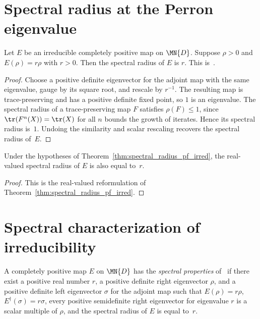 \section{Spectral radius at the Perron eigenvalue}

\begin{theorem}
    \label{thm:spectral_radius_pf_irred}
    \leanok
    Let $E$ be an irreducible completely positive map on $\MN{D}$.
    Suppose $\rho > 0$ and $E(\rho) = r \rho$ with $r > 0$.
    Then the spectral radius of $E$ is $r$.
    This is~\cite[Theorem~6.3(4)]{Wolf2012Quantum}.
\end{theorem}

\begin{proof}
    \leanok
    Choose a positive definite eigenvector for the adjoint map with the same
    eigenvalue, gauge by its square root, and rescale by $r^{-1}$.
    The resulting map is trace-preserving and has a positive definite fixed
    point, so $1$ is an eigenvalue. The spectral radius of a trace-preserving
    map $F$ satisfies $\rho(F) \le 1$, since $\tr(F^n(X)) = \tr(X)$ for all
    $n$ bounds the growth of iterates. Hence its spectral radius is~$1$.
    Undoing the similarity and scalar rescaling recovers the spectral radius
    of~$E$.
\end{proof}

\begin{theorem}
    \label{thm:spectral_radius_real_pf_irred}
    \leanok
    Under the hypotheses of Theorem~\ref{thm:spectral_radius_pf_irred}, the
    real-valued spectral radius of $E$ is also equal to~$r$.
\end{theorem}

\begin{proof}
    \leanok
    This is the real-valued reformulation of
    Theorem~\ref{thm:spectral_radius_pf_irred}.
\end{proof}

\section{Spectral characterization of irreducibility}

\begin{definition}
    \label{def:has_spectral_properties}
    \leanok
    A completely positive map $E$ on $\MN{D}$ has the \emph{spectral properties}
    of~\cite[Theorem~6.4]{Wolf2012Quantum} if there exist a positive real number $r$,
    a positive definite right eigenvector $\rho$, and a positive definite left
    eigenvector $\sigma$ for the adjoint map such that
    $E(\rho) = r \rho$, $E^\dagger(\sigma) = r \sigma$, every positive semidefinite
    right eigenvector for eigenvalue $r$ is a scalar multiple of $\rho$, and the
    spectral radius of $E$ is equal to~$r$.
\end{definition}

